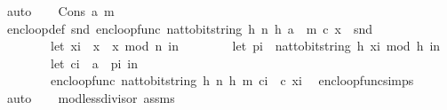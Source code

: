 \begin{isabellebody}
\ auto\isanewline
{}\isamarkupfalse%
\isanewline
\ \ \isamarkupfalse%
\ {\isacharparenleft}{\kern0pt}Cons\ a\ m{\isacharparenright}{\kern0pt}\isanewline
\ \ \isamarkupfalse%
\ \isamarkupfalse%
\ enc{\isacharunderscore}{\kern0pt}loop{\isacharunderscore}{\kern0pt}def{\isacharcolon}{\kern0pt}\ {\isachardoublequoteopen}snd\ {\isacharparenleft}{\kern0pt}enc{\isacharunderscore}{\kern0pt}loop{\isacharunderscore}{\kern0pt}func\ {\isacharparenleft}{\kern0pt}nat{\isacharunderscore}{\kern0pt}to{\isacharunderscore}{\kern0pt}bitstring\ h{\isacharcomma}{\kern0pt}\ n{\isacharcomma}{\kern0pt}\ h{\isacharcomma}{\kern0pt}\ {\isacharparenleft}{\kern0pt}a\ {\isacharhash}{\kern0pt}\ m{\isacharparenright}{\kern0pt}{\isacharparenright}{\kern0pt}\ c\ x{\isacharparenright}{\kern0pt}\ {\isacharequal}{\kern0pt}\ snd{\isacharparenleft}{\kern0pt}\isanewline
\ \ \ \ \ \ \ \ {\isacharparenleft}{\kern0pt}let\ x{\isacharunderscore}{\kern0pt}i\ {\isacharequal}{\kern0pt}\ x\ {\isacharasterisk}{\kern0pt}\ x\ mod\ n\ in\isanewline
\ \ \ \ \ \ \ \ let\ p{\isacharunderscore}{\kern0pt}i\ {\isacharequal}{\kern0pt}\ {\isacharparenleft}{\kern0pt}nat{\isacharunderscore}{\kern0pt}to{\isacharunderscore}{\kern0pt}bitstring\ h{\isacharparenright}{\kern0pt}\ {\isacharparenleft}{\kern0pt}x{\isacharunderscore}{\kern0pt}i\ mod\ {}{\isacharcircum}{\kern0pt}h{\isacharparenright}{\kern0pt}\ in\isanewline
\ \ \ \ \ \ \ \ let\ c{\isacharunderscore}{\kern0pt}i\ {\isacharequal}{\kern0pt}\ a\ {\isacharbrackleft}{\kern0pt}{\isasymoplus}{\isacharbrackright}{\kern0pt}\ p{\isacharunderscore}{\kern0pt}i\ in\isanewline
\ \ \ \ \ \ \ \ enc{\isacharunderscore}{\kern0pt}loop{\isacharunderscore}{\kern0pt}func\ {\isacharparenleft}{\kern0pt}{\isacharparenleft}{\kern0pt}nat{\isacharunderscore}{\kern0pt}to{\isacharunderscore}{\kern0pt}bitstring\ h{\isacharparenright}{\kern0pt}{\isacharcomma}{\kern0pt}\ n{\isacharcomma}{\kern0pt}\ h{\isacharcomma}{\kern0pt}\ m{\isacharparenright}{\kern0pt}\ {\isacharparenleft}{\kern0pt}c{\isacharunderscore}{\kern0pt}i\ {\isacharhash}{\kern0pt}\ c{\isacharparenright}{\kern0pt}\ x{\isacharunderscore}{\kern0pt}i{\isacharparenright}{\kern0pt}{\isacharparenright}{\kern0pt}{\isachardoublequoteclose}\ \isamarkupfalse%
\ enc{\isacharunderscore}{\kern0pt}loop{\isacharunderscore}{\kern0pt}func{\isachardot}{\kern0pt}simps\ \isamarkupfalse%
\ auto\isanewline
\isanewline
\ \ \isamarkupfalse%
\ mod{\isacharunderscore}{\kern0pt}less{\isacharunderscore}{\kern0pt}divisor\ assms{\isacharparenleft}{\kern0pt}{}{\isacharparenright}{\kern0pt}\ \isamarkupfalse%

\end{isabellebody}
